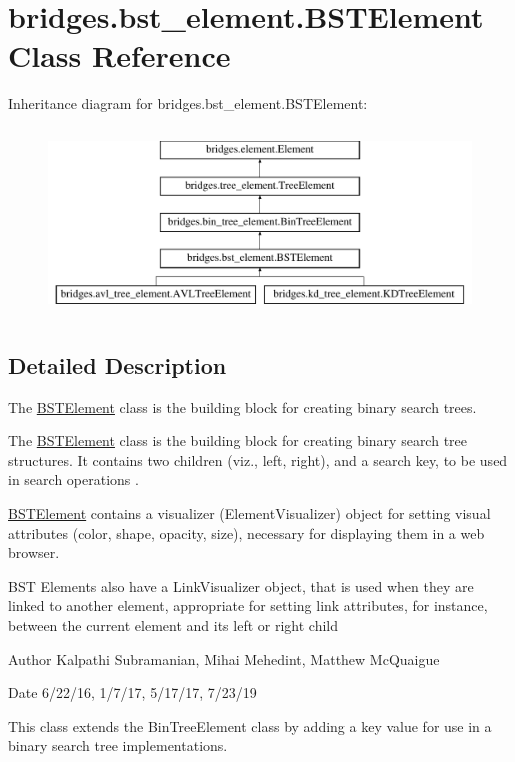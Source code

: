 \hypertarget{classbridges_1_1bst__element_1_1_b_s_t_element}{}\section{bridges.\+bst\+\_\+element.\+B\+S\+T\+Element Class Reference}
\label{classbridges_1_1bst__element_1_1_b_s_t_element}
Inheritance diagram for bridges.\+bst\+\_\+element.\+B\+S\+T\+Element\+:\begin{figure}[H]
\begin{center}
\leavevmode
\includegraphics[height=5.000000cm]{classbridges_1_1bst__element_1_1_b_s_t_element}
\end{center}
\end{figure}


\subsection{Detailed Description}
The \hyperlink{classbridges_1_1bst__element_1_1_b_s_t_element}{B\+S\+T\+Element} class is the building block for creating binary search trees. 

The \hyperlink{classbridges_1_1bst__element_1_1_b_s_t_element}{B\+S\+T\+Element} class is the building block for creating binary search tree structures. It contains two children (viz., left, right), and a search key, to be used in search operations .

\hyperlink{classbridges_1_1bst__element_1_1_b_s_t_element}{B\+S\+T\+Element} contains a visualizer (Element\+Visualizer) object for setting visual attributes (color, shape, opacity, size), necessary for displaying them in a web browser.

B\+ST Elements also have a Link\+Visualizer object, that is used when they are linked to another element, appropriate for setting link attributes, for instance, between the current element and its left or right child

\begin{DoxyAuthor}{Author}
Kalpathi Subramanian, Mihai Mehedint, Matthew Mc\+Quaigue
\end{DoxyAuthor}
\begin{DoxyDate}{Date}
6/22/16, 1/7/17, 5/17/17, 7/23/19
\end{DoxyDate}
This class extends the Bin\+Tree\+Element class by adding a \textquotesingle{}key\textquotesingle{} value for use in a binary search tree implementations.

